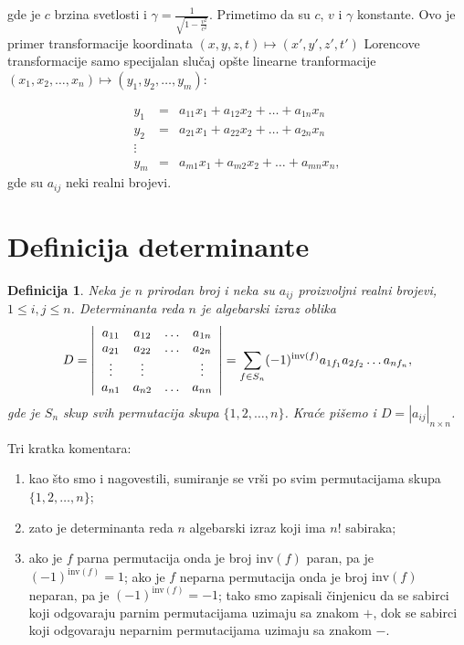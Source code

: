 \documentclass[11pt]{article}
\newtheorem{definition}{Definicija}
\begin{document}
gde je $c$ brzina svetlosti i $\gamma = \frac{1}{\sqrt{1 - \frac{v^2}{c^2}}}$. Primetimo da su
$c$, $v$ i $\gamma$
konstante. Ovo je primer transformacije koordinata $(x, y, z, t) \mapsto (x', y', z', t')$
Lorencove transformacije samo specijalan slučaj opšte linearne tranformacije $(x_1, x_2, \ldots, x_n) \mapsto (y_1, y_2, \ldots, y_m)$:

\begin{eqnarray*}
    y_1 &=& a_{11}x_1 + a_{12}x_2 + \ldots + a_{1n}x_n \\
    y_2 &=& a_{21}x_1 + a_{22}x_2 + \ldots + a_{2n}x_n \\
    \vdots \\
    y_m &=& a_{m1}x_1 + a_{m2}x_2 + \ldots + a_{mn}x_n,
\end{eqnarray*}
gde su $a_{ij}$ neki realni brojevi.

\section{Definicija determinante}
\begin{definition}
    Neka je $n$ prirodan broj i neka su $a_{ij}$ proizvoljni realni brojevi, $1 \leq i, j \leq n$.
Determinanta reda $n$ je algebarski izraz oblika
\[
    D = \left|
    \begin{array}[]{cccc}
        a_{11} & a_{12} & \ldots & a_{1n} \\
        a_{21} & a_{22} & \ldots & a_{2n} \\
        \vdots & \vdots & \hfill & \vdots \\
        a_{n1} & a_{n2} & \ldots & a_{nn}
    \end{array}
    \right| = 
    \sum_{f \in S_n} (-1)^{\mathrm{inv}(f)} a_{1f_1}a_{2f_2} \ldots a_{nf_n},
\]
gde je $S_n$ skup svih permutacija skupa $\{1, 2, \ldots, n\}$.
Kraće pišemo i $D = |a_{ij}|_{n \times n}$.
\end{definition}
\noindent
Tri kratka komentara:

\begin{enumerate}
    \item kao što smo i nagovestili, sumiranje se vrši po svim permutacijama skupa $\{1, 2, \ldots, n\}$;

    \item zato je determinanta reda $n$ algebarski izraz koji ima $n!$ sabiraka;
    
    \item ako je $f$ parna permutacija onda je broj $\mathrm{inv}(f)$ paran, pa je $(-1)^{\mathrm{inv}(f)} = 1$;
    ako je $f$ neparna permutacija onda je broj $\mathrm{inv}(f)$ neparan, pa je $(-1)^{\mathrm{inv}(f)} = -1$;
    tako smo zapisali činjenicu da se sabirci koji odgovaraju parnim permutacijama uzimaju sa znakom $+$,
    dok se sabirci koji odgovaraju neparnim permutacijama uzimaju sa znakom $-$.
\end{enumerate}
\end{document}
